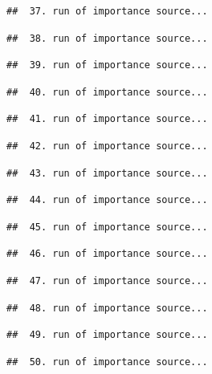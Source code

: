 \documentclass[
]{article}
\begin{document}
\begin{verbatim}
##  37. run of importance source...
\end{verbatim}

\begin{verbatim}
##  38. run of importance source...
\end{verbatim}

\begin{verbatim}
##  39. run of importance source...
\end{verbatim}

\begin{verbatim}
##  40. run of importance source...
\end{verbatim}

\begin{verbatim}
##  41. run of importance source...
\end{verbatim}

\begin{verbatim}
##  42. run of importance source...
\end{verbatim}

\begin{verbatim}
##  43. run of importance source...
\end{verbatim}

\begin{verbatim}
##  44. run of importance source...
\end{verbatim}

\begin{verbatim}
##  45. run of importance source...
\end{verbatim}

\begin{verbatim}
##  46. run of importance source...
\end{verbatim}

\begin{verbatim}
##  47. run of importance source...
\end{verbatim}

\begin{verbatim}
##  48. run of importance source...
\end{verbatim}

\begin{verbatim}
##  49. run of importance source...
\end{verbatim}

\begin{verbatim}
##  50. run of importance source...
\end{verbatim}
\end{document}
